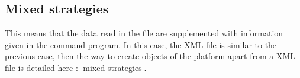 

\subsection{Mixed strategies}
This means that the data read in the file are supplemented with information given in the command
program.
In this case, the XML file is similar to the previous case, then the way to create objects of
the platform apart from a XML file is detailed here : \ref{mixed strategies}.






